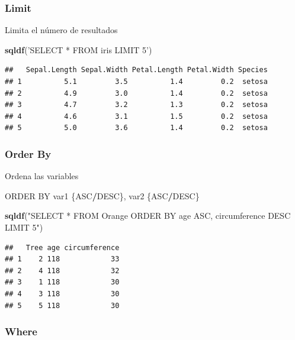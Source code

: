 \documentclass[]{book}
\newenvironment{Shaded}{\begin{snugshade}}{\end{snugshade}}
\newcommand{\KeywordTok}[1]{\textcolor[rgb]{0.13,0.29,0.53}{\textbf{#1}}}
\newcommand{\StringTok}[1]{\textcolor[rgb]{0.31,0.60,0.02}{#1}}
\newcommand{\OperatorTok}[1]{\textcolor[rgb]{0.81,0.36,0.00}{\textbf{#1}}}
\newcommand{\NormalTok}[1]{#1}
\begin{document}
\subsubsection{Limit}\label{limit}

Limita el número de resultados

\begin{Shaded}
\begin{Highlighting}[]
\KeywordTok{sqldf}\NormalTok{(}\StringTok{'SELECT * FROM iris LIMIT 5'}\NormalTok{)}
\end{Highlighting}
\end{Shaded}

\begin{verbatim}
##   Sepal.Length Sepal.Width Petal.Length Petal.Width Species
## 1          5.1         3.5          1.4         0.2  setosa
## 2          4.9         3.0          1.4         0.2  setosa
## 3          4.7         3.2          1.3         0.2  setosa
## 4          4.6         3.1          1.5         0.2  setosa
## 5          5.0         3.6          1.4         0.2  setosa
\end{verbatim}

\subsubsection{Order By}\label{order-by}

Ordena las variables

\begin{Shaded}
\begin{Highlighting}[]
\NormalTok{ORDER BY var1 \{ASC}\OperatorTok{/}\NormalTok{DESC\}, var2 \{ASC}\OperatorTok{/}\NormalTok{DESC\}}
\end{Highlighting}
\end{Shaded}

\begin{Shaded}
\begin{Highlighting}[]
\KeywordTok{sqldf}\NormalTok{(}\StringTok{"SELECT * FROM Orange ORDER BY age ASC, circumference DESC LIMIT 5"}\NormalTok{)}
\end{Highlighting}
\end{Shaded}

\begin{verbatim}
##   Tree age circumference
## 1    2 118            33
## 2    4 118            32
## 3    1 118            30
## 4    3 118            30
## 5    5 118            30
\end{verbatim}

\subsubsection{Where}\label{where}
\end{document}
